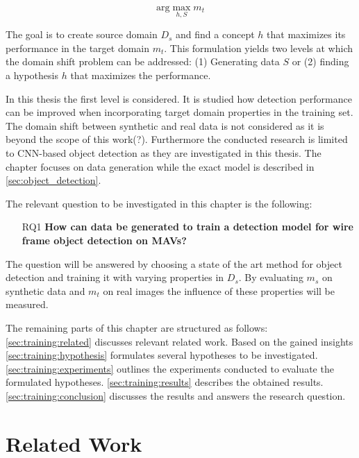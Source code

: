 $$
\text{arg}\max\limits_{h,S} m_t
$$

The goal is to create source domain $D_s$ and find a concept $h$ that maximizes its performance in the target domain $m_t$. This formulation yields two levels at which the domain shift problem can be addressed: (1) Generating data $S$ or (2) finding a hypothesis $h$ that maximizes the performance.

In this thesis the first level is considered. It is studied how detection performance can be improved when incorporating target domain properties in the training set. The domain shift between synthetic and real data is not considered as it is beyond the scope of this work(?). Furthermore the conducted research is limited to \ac{CNN}-based object detection as they are investigated in this thesis. The chapter focuses on data generation while the exact model is described in \autoref{sec:object_detection}.

The relevant question to be investigated in this chapter is the following:

\begin{center}
	\begin{enumerate}
		\item [RQ1] \textbf{How can data be generated to train a detection model for wire frame object detection on \acp{MAV}?}
	\end{enumerate}
\end{center}

The question will be answered by choosing a state of the art method for object detection and training it with varying properties in $D_s$. By evaluating $m_s$ on synthetic data and $m_t$ on real images the influence of these properties will be measured.  

The remaining parts of this chapter are structured as follows: \autoref{sec:training:related} discusses relevant related work. Based on the gained insights \autoref{sec:training:hypothesis} formulates several hypotheses to be investigated. \autoref{sec:training:experiments} outlines the experiments conducted to evaluate the formulated hypotheses. \autoref{sec:training:results} describes the obtained results. \autoref{sec:training:conclusion} discusses the results and answers the research question.

\section{Related Work}
\label{sec:training:related}

